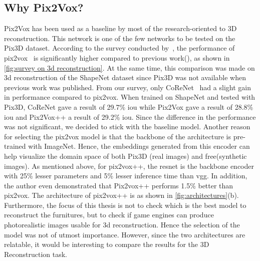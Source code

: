 \subsection{Why Pix2Vox?}\label{subsec:why-pix2vox?}
Pix2Vox has been used as a baseline by most of the research-oriented to 3D reconstruction.
This network is one of the few networks to be tested on the Pix3D dataset.
According to the survey conducted by~\cite{Han2021ImageBased3O}, the performance of pix2vox~\cite{Xie_2019}
is significantly higher compared to previous work(\cite{DBLP:journals/corr/TulsianiZEM17,tatarchenko2016multiview,richter2018matryoshka,gwak2017weakly,8265323}), as shown in \autoref{fig:survey on 3d reconstruction}.
At the same time, this comparison was made on 3d reconstruction of the ShapeNet dataset since Pix3D was not available when previous work was published.
From our survey, only CoReNet~\cite{popov2020corenet} had a slight gain in performance compared to pix2vox.
When trained on ShapeNet and tested with Pix3D, CoReNet gave a result of 29.7\% \gls{iou} while Pix2Vox gave a result of 28.8\% \gls{iou}  and Pix2Vox++ a result of 29.2\% \gls{iou}\@.
Since the difference in the performance was not significant, we decided to stick with the baseline model.
Another reason for selecting the pix2vox model is that the backbone of the architecture is pre-trained with ImageNet.
Hence, the embeddings generated from this encoder can help visualize the domain space of both Pix3D (real images)  and \gls{free}(synthetic images).
As mentioned above, for pix2vox++, the \gls{resnet} is the backbone encoder with 25\% lesser parameters and 5\% lesser inference time than \gls{vgg}\@.
In addition, the author even demonstrated that Pix2vox++ performs 1.5\% better than pix2vox.
The architecture of pix2vox++ is as shown in \autoref{fig:architectures}(b).
Furthermore, the focus of this thesis is not to check which is the best model to reconstruct the furnitures, but to check if game engines can produce photorealistic images usable for 3d reconstruction.
Hence the selection of the model was not of utmost importance.
However, since the two architectures are relatable, it would be interesting to compare the results for the 3D Reconstruction task.

%

